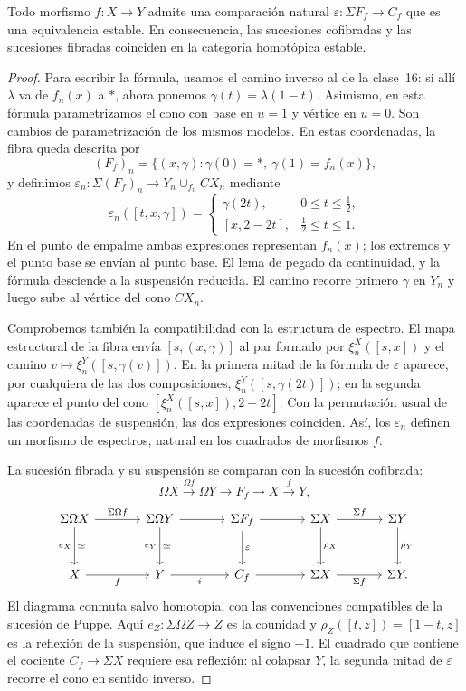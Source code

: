 \begin{prop}\label{prop:c17-fibra-cofibra}
Todo morfismo $f\colon X\to Y$ admite una comparación natural $\varepsilon\colon\Sigma F_f\to C_f$ que es una equivalencia estable. En consecuencia, las sucesiones cofibradas y las sucesiones fibradas coinciden en la categoría homotópica estable.
\end{prop}

\begin{proof}
Para escribir la fórmula, usamos el camino inverso al de la clase~16: si allí $\lambda$ va de $f_n(x)$ a $*$, ahora ponemos $\gamma(t)=\lambda(1-t)$. Asimismo, en esta fórmula parametrizamos el cono con base en $u=1$ y vértice en $u=0$. Son cambios de parametrización de los mismos modelos. En estas coordenadas, la fibra queda descrita por
\[
(F_f)_n=\{(x,\gamma):\gamma(0)=*,\ \gamma(1)=f_n(x)\},
\]
y definimos $\varepsilon_n\colon\Sigma(F_f)_n\to Y_n\cup_{f_n}CX_n$ mediante
\[
\varepsilon_n([t,x,\gamma])=
\begin{cases}
\gamma(2t),&0\le t\le\frac12,\\
[x,2-2t],&\frac12\le t\le1.
\end{cases}
\]
En el punto de empalme ambas expresiones representan $f_n(x)$; los extremos y el punto base se envían al punto base. El lema de pegado da continuidad, y la fórmula desciende a la suspensión reducida. El camino recorre primero $\gamma$ en $Y_n$ y luego sube al vértice del cono $CX_n$.

Comprobemos también la compatibilidad con la estructura de espectro. El mapa estructural de la fibra envía $[s,(x,\gamma)]$ al par formado por $\xi_n^X([s,x])$ y el camino $v\mapsto\xi_n^Y([s,\gamma(v)])$. En la primera mitad de la fórmula de $\varepsilon$ aparece, por cualquiera de las dos composiciones, $\xi_n^Y([s,\gamma(2t)])$; en la segunda aparece el punto del cono $[\xi_n^X([s,x]),2-2t]$. Con la permutación usual de las coordenadas de suspensión, las dos expresiones coinciden. Así, los $\varepsilon_n$ definen un morfismo de espectros, natural en los cuadrados de morfismos $f$.

La sucesión fibrada y su suspensión se comparan con la sucesión cofibrada:
\[
\Omega X\xrightarrow{\Omega f}\Omega Y\longrightarrow F_f
\longrightarrow X\xrightarrow{f}Y,
\]
\[
\begin{tikzcd}[column sep=large,row sep=large]
\Sigma\Omega X\arrow[r,"\Sigma\Omega f"]\arrow[d,"e_X"',"\simeq"]
&\Sigma\Omega Y\arrow[r]\arrow[d,"e_Y"',"\simeq"]
&\Sigma F_f\arrow[r]\arrow[d,"\varepsilon"]
&\Sigma X\arrow[r,"\Sigma f"]\arrow[d,"\rho_X"]
&\Sigma Y\arrow[d,"\rho_Y"]\\
X\arrow[r,"f"']&Y\arrow[r,"i"']&C_f\arrow[r]&\Sigma X\arrow[r,"\Sigma f"']&\Sigma Y.
\end{tikzcd}
\]
El diagrama conmuta salvo homotopía, con las convenciones compatibles de la sucesión de Puppe. Aquí $e_Z\colon\Sigma\Omega Z\to Z$ es la counidad y $\rho_Z([t,z])=[1-t,z]$ es la reflexión de la suspensión, que induce el signo $-1$. El cuadrado que contiene el cociente $C_f\to\Sigma X$ requiere esa reflexión: al colapsar $Y$, la segunda mitad de $\varepsilon$ recorre el cono en sentido inverso.


\end{proof}
